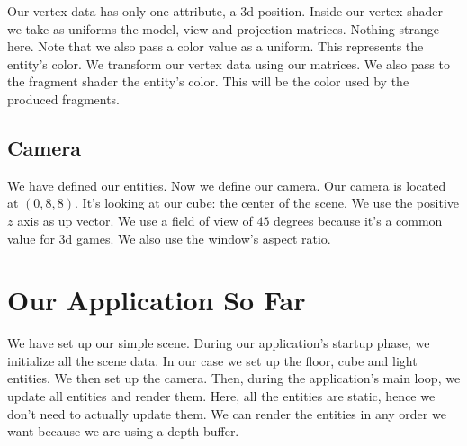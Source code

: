 \begin{minipage}{\linewidth}{\noindent}
    
\end{minipage}

Our vertex data has only one attribute, a 3d position.
Inside our vertex shader we take as uniforms the model,
view and projection matrices.
Nothing strange here.
Note that we also pass a color value as a uniform.
This represents the entity's color.
We transform our vertex data using our matrices.
We also pass to the fragment shader the entity's color.
This will be the color used by the produced fragments.

\subsection{Camera}

We have defined our entities.
Now we define our camera.
Our camera is located at $(0, 8, 8)$.
It's looking at our cube: the center of the scene.
We use the positive $z$ axis as up vector.
We use a field of view of $45$ degrees because it's a common value for 3d games.
We also use the window's aspect ratio.

\begin{minipage}{\linewidth}{\noindent}
    
\end{minipage}

\section{Our Application So Far}

We have set up our simple scene.
During our application's startup phase, we initialize all the scene data.
In our case we set up the floor, cube and light entities.
We then set up the camera.
Then, during the application's main loop, we update all entities and render them.
Here, all the entities are static, hence we don't need to actually update them.
We can render the entities in any order we want because we are using a depth buffer.

\begin{minipage}{\linewidth}{\noindent}
    
\end{minipage}
